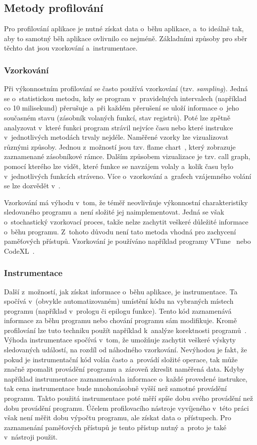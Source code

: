 \subsection{Metody profilování}
Pro profilování aplikace je nutné získat data o~běhu aplikace, a~to ideálně tak, aby to samotný běh aplikace ovlivnilo co nejméně. Základními způsoby pro sběr těchto dat jsou vzorkování a~instrumentace.

\subsubsection{Vzorkování}
Při výkonnostním profilování se často používá vzorkování (tzv. \emph{sampling}). Jedná se o~statistickou metodu, kdy se program v~pravidelných intervalech (například co 10 milisekund) přerušuje a~při každém přerušení se uloží informace o~jeho současném stavu (zásobník volaných funkcí, stav registrů). Poté lze zpětně analyzovat v~které funkci program strávil nejvíce času nebo které instrukce v~jednotlivých metodách trvaly nejdéle. Naměřené vzorky lze vizualizovat různými způsoby. Jednou z~možností jsou tzv. flame chart~\cite{flamegraph}, který zobrazuje zaznamenané zásobníkové rámce. Dalším způsobem vizualizace je tzv. call graph, pomocí kterého lze vidět, které funkce se navzájem volaly a~kolik času bylo v~jednotlivých funkcích stráveno. Více o~vzorkování a~grafech vzájemného volání se lze dozvědět v~\cite{gprof}.

Vzorkování má výhodu v~tom, že téměř neovlivňuje výkonnostní charakteristiky sledovaného programu a~není složité jej naimplementovat. Jedná se však o~stochastický vzorkovací proces, takže nelze zachytit veškeré důležité informace o~běhu programu. Z~tohoto důvodu není tato metoda vhodná pro zachycení paměťových přístupů. Vzorkování je používáno například programy VTune~\cite{vtune} nebo CodeXL~\cite{codexl}.

\subsubsection{Instrumentace}
Další z~možností, jak získat informace o~běhu aplikace, je instrumentace. Ta spočívá v~(obvykle automatizovaném) umístění kódu na vybraných místech programu (například v~prologu či epilogu funkce). Tento kód zaznamenává informace za běhu programu nebo chování programu sám modifikuje. Kromě profilování lze tuto techniku použít například k~analýze korektnosti programů~\cite{memcheck}. Výhoda instrumentace spočívá v~tom, že umožňuje zachytit veškeré výskyty sledovaných událostí, na rozdíl od náhodného vzorkování. Nevýhodou je fakt, že pokud je instrumentační kód volán často a~provádí složité operace, tak může značně zpomalit provádění programu a~zároveň zkreslit naměřená data. Kdyby například instrumentace zaznamenávala informace o~každé provedené instrukce, tak cena instrumentace bude mnohonásobně vyšší než samotné provádění programu. Takto použitá instrumentace poté měří spíše dobu svého provádění než dobu provádění programu. Účelem profilovacího nástroje vyvíjeného v~této práci však není měřit dobu výpočtu programu, ale získat data o~přístupech. Pro zaznamenání paměťových přístupů je tento přístup nutný a~proto je také v~nástroji použit.

